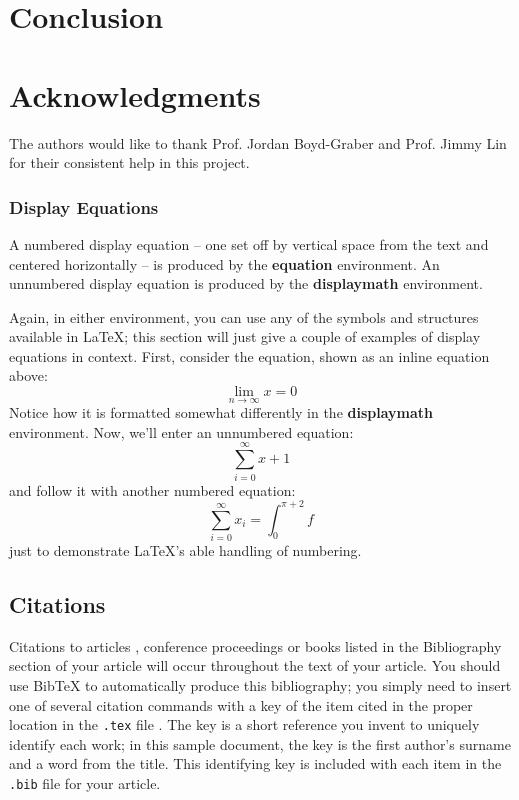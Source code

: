 \documentclass{acm_proc_article-sp}
\begin{document}
\section{Conclusion}\label{sec:con}

\section*{Acknowledgments}
The authors would like to thank Prof. Jordan Boyd-Graber and Prof. Jimmy Lin for their consistent help in this project.



\appendix



\subsubsection{Display Equations}
A numbered display equation -- one set off by vertical space
from the text and centered horizontally -- is produced
by the \textbf{equation} environment. An unnumbered display
equation is produced by the \textbf{displaymath} environment.

Again, in either environment, you can use any of the symbols
and structures available in \LaTeX; this section will just
give a couple of examples of display equations in context.
First, consider the equation, shown as an inline equation above:
\begin{equation}\lim_{n\rightarrow \infty}x=0\end{equation}
Notice how it is formatted somewhat differently in
the \textbf{displaymath}
environment.  Now, we'll enter an unnumbered equation:
\begin{displaymath}\sum_{i=0}^{\infty} x + 1\end{displaymath}
and follow it with another numbered equation:
\begin{equation}\sum_{i=0}^{\infty}x_i=\int_{0}^{\pi+2} f\end{equation}
just to demonstrate \LaTeX's able handling of numbering.

\subsection{Citations}
Citations to articles \cite{bowman:reasoning, clark:pct, braams:babel, herlihy:methodology},
conference
proceedings \cite{clark:pct} or books \cite{salas:calculus, Lamport:LaTeX} listed
in the Bibliography section of your
article will occur throughout the text of your article.
You should use BibTeX to automatically produce this bibliography;
you simply need to insert one of several citation commands with
a key of the item cited in the proper location in
the \texttt{.tex} file \cite{Lamport:LaTeX}.
The key is a short reference you invent to uniquely
identify each work; in this sample document, the key is
the first author's surname and a
word from the title.  This identifying key is included
with each item in the \texttt{.bib} file for your article.
\end{document}
